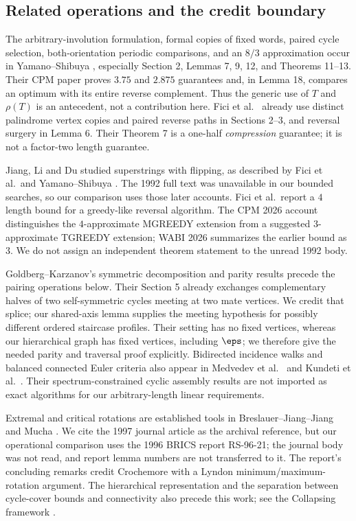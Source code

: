 \subsection{Related operations and the credit boundary}\label{sec:antecedents}
The arbitrary-involution formulation, formal copies of fixed words,
paired cycle selection, both-orientation periodic comparisons, and an
$8/3$ approximation occur in Yamano--Shibuya \cite{yswabi}, especially
Section 2, Lemmas 7, 9, 12, and Theorems 11--13. Their CPM paper
\cite{yscpm} proves $3.75$ and $2.875$ guarantees and, in Lemma 18,
compares an optimum with its entire reverse complement. Thus the generic
use of $T$ and $\rho(T)$ is an antecedent, not a contribution here.
Fici et al.\ \cite{fici} already use distinct palindrome vertex copies
and paired reverse paths in Sections 2--3, and reversal surgery in
Lemma 6. Their Theorem 7 is a one-half \emph{compression} guarantee;
it is not a factor-two length guarantee.

Jiang, Li and Du studied superstrings with flipping, as described by
Fici et al.\ and Yamano--Shibuya \cite{jld,fici,yscpm,yswabi}.
The 1992 full text was unavailable in our bounded searches, so our
comparison uses those later accounts. Fici et al.\ report a $4$ length
bound for a greedy-like reversal algorithm. The CPM 2026 account
distinguishes the $4$-approximate MGREEDY extension from a suggested
$3$-approximate TGREEDY extension; WABI 2026 summarizes the earlier bound
as $3$. We do not assign an independent theorem statement to the unread
1992 body.

Goldberg--Karzanov's symmetric decomposition and parity results
\cite[Theorem 3.1 and Corollary 3.2]{gk} precede the pairing operations
below. Their Section 5 already exchanges complementary halves of two
self-symmetric cycles meeting at two mate vertices. We credit that splice;
our shared-axis lemma supplies the meeting hypothesis for possibly
different ordered staircase profiles. Their setting has no fixed vertices,
whereas our hierarchical graph has fixed vertices, including $\eps$;
we therefore give the needed parity and traversal proof explicitly.
Bidirected incidence walks and balanced connected Euler criteria also
appear in Medvedev et al.\ \cite[Section 2.2, Lemma 1]{medvedev}
and Kundeti et al.\ \cite[Section 6]{kundeti}. Their spectrum-constrained
cyclic assembly results are not imported as exact algorithms for our
arbitrary-length linear requirements.

Extremal and critical rotations are established tools in
Breslauer--Jiang--Jiang \cite{bjjjournal,bjjreport} and Mucha \cite{mucha}.
We cite the 1997 journal article as the archival reference, but our
operational comparison uses the 1996 BRICS report RS-96-21; the journal
body was not read, and report lemma numbers are not transferred to it.
The report's concluding remarks credit Crochemore with a Lyndon
minimum/maximum-rotation argument. The hierarchical representation and
the separation between cycle-cover bounds and connectivity also precede
this work; see the Collapsing framework \cite[Sections 2.2 and 7.2]{collapsing}.

